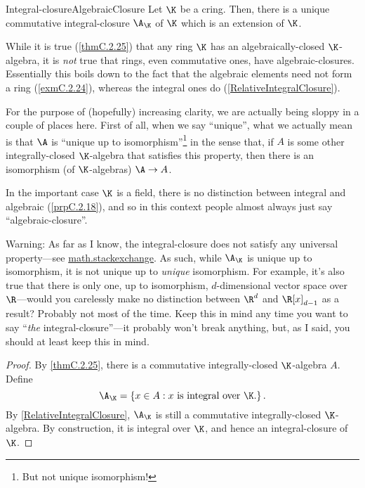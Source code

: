 \begin{thm}{Integral-closure}{AlgebraicClosure}
	Let $\K$ be a cring.  Then, there is a unique commutative integral-closure $\A _{\K}$\index[notation]{$\A _{\K}$} of $\K$ which is an extension of $\K$.
	\begin{rmk}
		While it is true (\cref{thmC.2.25}) that any ring $\K$ has an algebraically-closed $\K$-algebra, it is \emph{not} true that rings, even commutative ones, have algebraic-closures.  Essentially this boils down to the fact that the algebraic elements need not form a ring (\cref{exmC.2.24}), whereas the integral ones do (\cref{RelativeIntegralClosure}).
	\end{rmk}
	\begin{rmk}
		For the purpose of (hopefully) increasing clarity, we are actually being sloppy in a couple of places here.  First of all, when we say ``unique'', what we actually mean is that $\A$ is ``unique up to isomorphism''\footnote{But not unique isomorphism!} in the sense that, if $A$ is some other integrally-closed $\K$-algebra that satisfies this property, then there is an isomorphism (of $\K$-algebras) $\A \rightarrow A$.
	\end{rmk}
	\begin{rmk}
		In the important case $\K$ is a field, there is no distinction between integral and algebraic (\cref{prpC.2.18}), and so in this context people almost always just say ``algebraic-closure''.
	\end{rmk}
	\begin{rmk}
		Warning:  As far as I know, the integral-closure does not satisfy any universal property---see \href{https://math.stackexchange.com/questions/1033209/universal-property-of-the-algebraic-closure-of-a-field}{math.stackexchange}.  As such, while $\A _{\K}$ is unique up to isomorphism, it is not unique up to \emph{unique} isomorphism.  For example, it's also true that there is only one, up to isomorphism, $d$-dimensional vector space over $\R$---would you carelessly make no distinction between $\R ^d$ and $\R [x]_{d-1}$ as a result?  Probably not most of the time.  Keep this in mind any time you want to say ``\emph{the} integral-closure''---it probably won't break anything, but, as I said, you should at least keep this in mind.
	\end{rmk}
	\begin{proof}
		By \cref{thmC.2.25}, there is a commutative integrally-closed $\K$-algebra $A$.  Define
		\begin{equation}
			\A _{\K}=\left\{ x\in A:x\text{ is integral over }\K \text{.}\right\} .
		\end{equation}
		By \cref{RelativeIntegralClosure}, $\A _{\K}$ is still a commutative integrally-closed $\K$-algebra.  By construction, it is integral over $\K$, and hence an integral-closure of $\K$.
		

\end{proof}
\end{thm}
